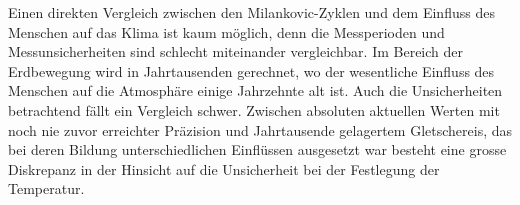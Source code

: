 Einen direkten Vergleich zwischen den Milankovic-Zyklen und dem Einfluss des Menschen auf das Klima ist kaum möglich, denn die Messperioden und Messunsicherheiten sind schlecht miteinander vergleichbar.
Im Bereich der Erdbewegung wird in Jahrtausenden gerechnet, wo der wesentliche Einfluss des Menschen auf die Atmosphäre einige Jahrzehnte alt ist.
Auch die Unsicherheiten betrachtend fällt ein Vergleich schwer.
Zwischen absoluten aktuellen Werten mit noch nie zuvor erreichter Präzision und Jahrtausende gelagertem Gletschereis, das bei deren Bildung unterschiedlichen Einflüssen ausgesetzt war besteht eine grosse Diskrepanz in der Hinsicht auf die Unsicherheit bei der Festlegung der Temperatur.





